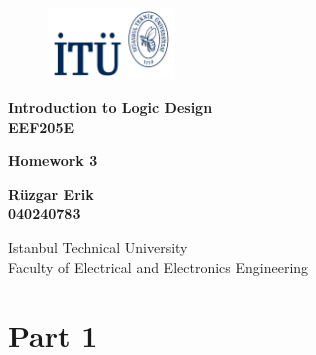 \documentclass[table]{article}
\def\mytitle{Homework 3}
\begin{document}
\begin{titlepage}
    \begin{figure}[h] %
        \begin{flushright}
        \includegraphics[width=0.3\textwidth]{logo_laci.png} %
            
        \end{flushright}
        \hfill
    \end{figure}

    \centering
    \vspace*{1in}
    
    \Huge
    \textbf{Introduction to Logic Design} \\
    \textbf{EEF205E} \\

    \vspace{0.5in}

    \Large
    \textbf{\mytitle} \\
    
    \vspace{0.5in}

    \large
    \textbf{Rüzgar Erik} \\
    \textbf{040240783} \\

    \vspace{0.5in}
    
    \Large
    Istanbul Technical University \\
    Faculty of Electrical and Electronics Engineering \\
    
    \vfill


\end{titlepage}



\section*{Part 1}
\end{document}
